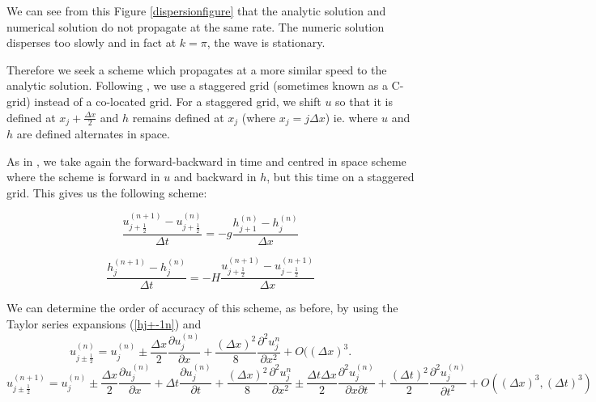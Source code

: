 \documentclass[a4paper,12pt, notitlepage]{article}
\begin{document}
We can see from this Figure \ref{dispersionfigure} that the analytic solution and numerical solution do not propagate at the same rate. The numeric solution disperses too slowly and in fact at $k = \pi$, the wave is stationary. 

Therefore we seek a scheme which propagates at a more similar speed to the analytic solution. Following \cite{MPE textbook}, we use a staggered grid (sometimes known as a C-grid) instead of a co-located grid. For a staggered grid, we shift $u$ so that it is defined at $x_{j} + \frac{\Delta x}{2}$ and $h$ remains defined at $x_{j}$ (where $x_{j} = j \Delta x$) ie. where $u$ and $h$ are defined alternates in space.

As in \cite{MPE textbook}, we take again the forward-backward in time and centred in space scheme where the scheme is forward in $u$ and backward in $h$, but this time on a staggered grid. This gives us the following scheme:

\begin{equation}\label{FTCSCgrid}
\frac{u_{j+ \frac{1}{2}}^{(n+1)} - u_{j + \frac{1}{2}}^{(n)}}{\Delta t} = -g \frac{h_{j+1}^{(n)} - h_{j}^{(n)}}{\Delta x}
\end{equation}

\begin{equation}\label{BTCSCgrid}
\frac{h_{j}^{(n+1)} - h_{j}^{(n)}}{\Delta t} = -H \frac{u_{j+\frac{1}{2}}^{(n+1)} - u_{j-\frac{1}{2}}^{(n+1)}}{\Delta x}
\end{equation}


We can determine the order of accuracy of this scheme, as before, by using the Taylor series expansions (\ref{hj+-1n}) and 
\begin{equation} \label{uj+1/2n}
u_{j \pm \frac{1}{2}}^{(n)} = u_{j}^{(n)} \pm \frac{\Delta x}{2}\frac{\partial u_{j}^{(n)}}{\partial x} + \frac{(\Delta x)^{2}}{8}\frac{\partial^{2}u_{j}^{n}}{\partial x^{2}} + O({(\Delta x)^{3}}.
\end{equation}
\begin{equation} \label{uj+1/2n+1}
u_{j \pm \frac{1}{2}}^{(n + 1)} = u_{j}^{(n)} \pm \frac{\Delta x}{2}\frac{\partial u_{j}^{(n)}}{\partial x} + \Delta t \frac{\partial u_{j}^{(n)}}{\partial t} + \frac{(\Delta x)^{2}}{8}\frac{\partial^{2}u_{j}^{n}}{\partial x^{2}} \pm \frac{\Delta t \Delta x}{2}\frac{\partial^{2} u_{j}^{(n)}}{\partial x \partial t} + \frac{(\Delta t)^{2}}{2} \frac{\partial ^{2} u_{j}^{(n)}}{\partial t ^{2}} + O((\Delta x)^{3}, (\Delta t)^{3})
\end{equation}
\end{document}
